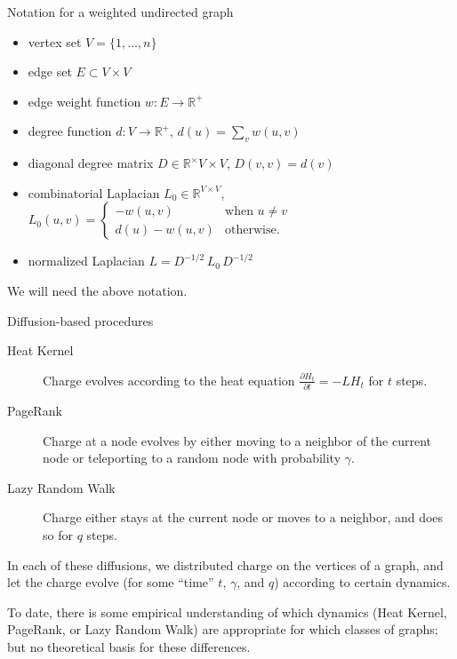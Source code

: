 \documentclass[xcolor=dvipsnames]{beamer}
\begin{document}
\begin{frame}
  \begin{block}{Notation for a weighted undirected graph}
  \begin{itemize}
    \item vertex set $V = \{ 1, \dotsc, n \}$ 
    \item edge set $E \subset V \times V$
    \item edge weight function $w : E \to \mathbb{R}^+$
    \item degree function $d : V \to \mathbb{R}^+$, $d(u) = \sum_v w(u,v)$
    \item diagonal degree matrix $D \in \mathbb{R}^\times{V \times V}$, $D(v,v) = d(v)$
    \item combinatorial Laplacian $L_0 \in \mathbb{R}^{V \times V}$,
    	$L_0(u,v) = \begin{cases}
		-w(u,v) &\text{when $u \neq v$} \\
		d(u) - w(u,v) &\text{otherwise.}
	\end{cases}$
    \item normalized Laplacian $L = D^{-1/2} \, L_0 \, D^{-1/2}$
  \end{itemize}
  \end{block}
  We will need the above notation.
\end{frame}

\begin{frame}
  \begin{block}{Diffusion-based procedures}
  \begin{description}
    \item[Heat Kernel] Charge evolves according to the heat equation
    	$\frac{\partial H_t}{\partial t} = - L H_t$ for $t$ steps.
    \item[PageRank] Charge at a node evolves by either moving to a neighbor
    	of the current node or teleporting to a random node with 
        probability $\gamma$.
    \item[Lazy Random Walk] Charge either stays at the current node or moves
        to a neighbor, and does so for $q$ steps.
  \end{description}
  \end{block}

  In each of these diffusions, we distributed charge on the vertices of a
  graph, and let the charge evolve (for some ``time'' $t$, $\gamma$, and $q$) 
  according to certain dynamics.  

  To date, there is some empirical understanding of which dynamics (Heat 
  Kernel, PageRank, or Lazy Random Walk) are appropriate for which classes 
  of graphs; but no theoretical basis for these differences.

\end{frame}
\end{document}
